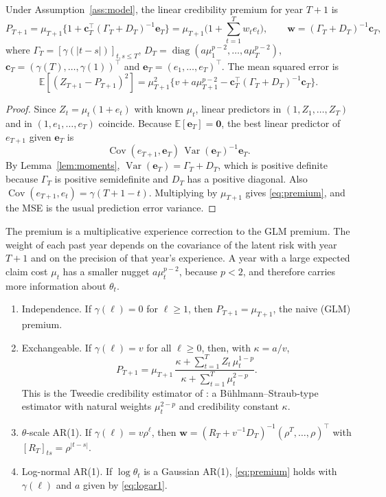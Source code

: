 \documentclass[mathematics,article,submit,moreauthors]{Definitions/mdpi}
\DeclareMathOperator{\Var}{Var}
\DeclareMathOperator{\Cov}{Cov}
\DeclareMathOperator{\diag}{diag}
\newcommand{\E}{\mathbb{E}}
\newcommand{\be}{\boldsymbol{e}}
\newcommand{\bc}{\boldsymbol{c}}
\newcommand{\bw}{\boldsymbol{w}}
\begin{document}
\begin{Theorem}\label{thm:main}
Under Assumption~\ref{ass:model}, the linear credibility premium for year $T+1$ is
\begin{equation}\label{eq:premium}
P_{T+1}=\mu_{T+1}\Big\{1+\bc_T^\top(\Gamma_T+D_T)^{-1}\be_T\Big\}=\mu_{T+1}\Big(1+\sum_{t=1}^Tw_te_t\Big),\qquad \bw=(\Gamma_T+D_T)^{-1}\bc_T,
\end{equation}
where $\Gamma_T=[\gamma(|t-s|)]_{t,s\le T}$, $D_T=\diag(a\mu_1^{p-2},\dots,a\mu_T^{p-2})$, $\bc_T=(\gamma(T),\dots,\gamma(1))^\top$ and $\be_T=(e_1,\dots,e_T)^\top$. The mean squared error is
\[
\E[(Z_{T+1}-P_{T+1})^2]=\mu_{T+1}^2\big\{v+a\mu_{T+1}^{p-2}-\bc_T^\top(\Gamma_T+D_T)^{-1}\bc_T\big\}.
\]
\end{Theorem}

\begin{proof}
Since $Z_t=\mu_t(1+e_t)$ with known $\mu_t$, linear predictors in $(1,Z_1,\dots,Z_T)$ and in $(1,e_1,\dots,e_T)$ coincide. Because $\E[\be_T]=\boldsymbol0$, the best linear predictor of $e_{T+1}$ given $\be_T$ is
\[
\Cov(e_{T+1},\be_T)\,\Var(\be_T)^{-1}\be_T .
\]
 By Lemma~\ref{lem:moments}, $\Var(\be_T)=\Gamma_T+D_T$, which is positive definite because $\Gamma_T$ is positive semi\-definite and $D_T$ has a positive diagonal. Also $\Cov(e_{T+1},e_t)=\gamma(T+1-t)$. Multiplying by $\mu_{T+1}$ gives \eqref{eq:premium}, and the MSE is the usual prediction error variance.
\end{proof}

The premium is a multiplicative experience correction to the GLM premium. The weight of each past year depends on the covariance of the latent risk with year $T+1$ and on the precision of that year's experience. A year with a large expected claim cost $\mu_t$ has a smaller nugget $a\mu_t^{p-2}$, because $p<2$, and therefore carries more information about $\theta_t$.

\begin{Corollary}\label{cor:special}
\begin{enumerate}
\item[(i)] \textup{Independence.} If $\gamma(\ell)=0$ for $\ell\ge1$, then $P_{T+1}=\mu_{T+1}$, the naive (GLM) premium.
\item[(ii)] \textup{Exchangeable.} If $\gamma(\ell)=v$ for all $\ell\ge0$, then, with $\kappa=a/v$,
\begin{equation}\label{eq:static}
P_{T+1}=\mu_{T+1}\,\frac{\kappa+\sum_{t=1}^TZ_t\,\mu_t^{1-p}}{\kappa+\sum_{t=1}^T\mu_t^{2-p}}.
\end{equation}
This is the Tweedie credibility estimator of \citet{ohlsson2006exact}: a B\"uhlmann--Straub-type estimator with natural weights $\mu_t^{2-p}$ and credibility constant $\kappa$.
\item[(iii)] \textup{$\theta$-scale AR(1).} If $\gamma(\ell)=v\rho^\ell$, then $\bw=(R_T+v^{-1}D_T)^{-1}(\rho^T,\dots,\rho)^\top$ with $[R_T]_{ts}=\rho^{|t-s|}$.
\item[(iv)] \textup{Log-normal AR(1).} If $\log\theta_t$ is a Gaussian AR(1), \eqref{eq:premium} holds with $\gamma(\ell)$ and $a$ given by \eqref{eq:logar1}.
\end{enumerate}
\end{Corollary}
\end{document}
